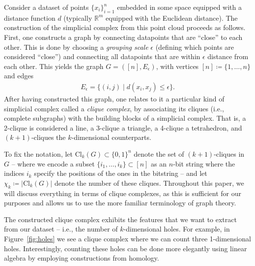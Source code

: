 \documentclass[a4paper, onecolumn, accepted=2022-08-28]{quantumarticle}
\begin{document}
Consider a dataset of points $\{x_i\}_{i=1}^n$ embedded in some space equipped with a distance function $d$ (typically $\mathbb{R}^m$ equipped with the Euclidean distance).
The construction of the simplicial complex from this point cloud proceeds as follows.
First, one constructs a graph by connecting datapoints that are ``close'' to each other.
This is done by choosing a \emph{grouping scale} $\epsilon$ (defining which points are considered ``close'') and connecting all datapoints that are within $\epsilon$ distance from each other.
This yields the graph $G=([n], E_{\epsilon})$, with vertices $[n] \coloneqq \{1, \ldots, n\}$ and edges
\begin{align*}
E_\epsilon = \{(i, j) \mid d(x_i, x_j) \leq \epsilon\}.
\end{align*}
After having constructed this graph, one relates to it a particular kind of simplicial complex called a \emph{clique complex}, by associating its cliques (i.e., complete subgraphs) with the building blocks of a simplicial complex\footnotemark[1].
That is, a 2-clique is considered a line, a 3-clique a triangle, a 4-clique a tetrahedron, and $(k+1)$-cliques the $k$-dimensional counterparts\footnotemark[2].

To fix the notation, let $\text{Cl}_k(G) \subset \{0, 1\}^n$ denote the set of $(k+1)$-cliques in $G$ -- where we encode a subset $\{i_1, \dots, i_k\} \subset [n]$ as an $n$-bit string where the indices $i_k$ specify the positions of the ones in the bitstring -- and let $\chi_k \coloneqq |\text{Cl}_k(G)|$ denote the number of these cliques.
Throughout this paper, we will discuss everything in terms of clique complexes, as this is sufficient for our purposes and allows us to use the more familiar terminology of graph theory.

The constructed clique complex exhibits the features that we want to extract from our dataset -- i.e., the number of $k$-dimensional holes.
For example, in Figure~\ref{fig:holes} we see a clique complex where we can count three 1-dimensional holes.
Interestingly, counting these holes can be done more elegantly using linear algebra by employing constructions from homology.
\end{document}

